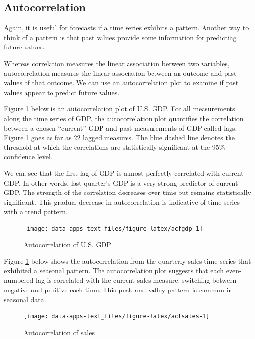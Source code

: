 \documentclass[
]{book}
\begin{document}
\hypertarget{autocorrelation}{%
\subsection{Autocorrelation}\label{autocorrelation}}

Again, it is useful for forecasts if a time series exhibits a pattern. Another way to think of a pattern is that past values provide some information for predicting future values.

Whereas correlation measures the linear association between two variables, autocorrelation measures the linear association between an outcome and past values of that outcome. We can use an autocorrelation plot to examine if past values appear to predict future values.

Figure \ref{fig:acfgdp} below is an autocorrelation plot of U.S. GDP. For all measurements along the time series of GDP, the autocorrelation plot quantifies the correlation between a chosen ``current'' GDP and past measurements of GDP called lags. Figure \ref{fig:acfgdp} goes as far as 22 lagged measures. The blue dashed line denotes the threshold at which the correlations are statistically significant at the 95\% confidence level.

We can see that the first lag of GDP is almost perfectly correlated with current GDP. In other words, last quarter's GDP is a very strong predictor of current GDP. The strength of the correlation decreases over time but remains statistically significant. This gradual decrease in autocorrelation is indicative of time series with a trend pattern.

\begin{figure}

{\centering \texttt{[image: data-apps-text\_files/figure-latex/acfgdp-1]} 

}

\caption{Autocorrelation of U.S. GDP}\label{fig:acfgdp}
\end{figure}

Figure \ref{fig:acfgdp} below shows the autocorrelation from the quarterly sales time series that exhibited a seasonal pattern. The autocorrelation plot suggests that each even-numbered lag is correlated with the current sales measure, switching between negative and positive each time. This peak and valley pattern is common in seasonal data.

\begin{figure}

{\centering \texttt{[image: data-apps-text\_files/figure-latex/acfsales-1]} 

}

\caption{Autocorrelation of sales}\label{fig:acfsales}
\end{figure}
\end{document}
